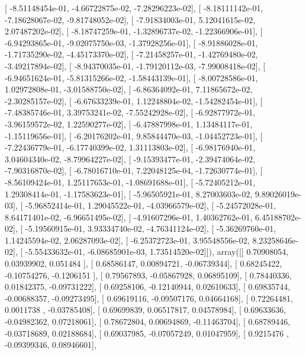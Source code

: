 \documentclass{article}
\begin{document}
       [ -8.51148454e-01,  -4.66722875e-02,  -7.28296223e-02],
       [ -8.18111142e-01,  -7.18628067e-02,  -9.81748052e-02],
       [ -7.91834003e-01,   5.12041615e-02,   2.07487202e-02],
       [ -8.18747259e-01,  -1.32896737e-02,  -1.22366906e-01],
       [ -6.94293865e-01,  -9.02075750e-03,  -1.37928256e-01],
       [ -8.91886028e-01,  -1.71735290e-02,  -4.45173370e-02],
       [ -7.21458257e-01,  -1.42769480e-02,  -3.49217894e-02],
       [ -8.94370035e-01,  -1.79120112e-03,  -7.99008418e-02],
       [ -6.94651624e-01,  -5.81315266e-02,  -1.58443139e-01],
       [ -8.00728586e-01,   1.02972808e-01,  -3.01588750e-02],
       [ -6.86364092e-01,   7.11865672e-02,  -2.30285157e-02],
       [ -6.67633239e-01,   1.12248804e-02,  -1.54282454e-01],
       [ -7.48385746e-01,   3.39753241e-02,  -7.55242928e-02],
       [ -6.92877972e-01,  -3.96159572e-02,   1.22590277e-02],
       [ -6.47887998e-01,   1.13484117e-01,  -1.15119656e-01],
       [ -6.20176202e-01,   9.85844470e-03,  -1.04452723e-01],
       [ -7.22436779e-01,  -6.17740399e-02,   1.31113803e-02],
       [ -6.98176940e-01,   3.04604340e-02,  -8.79964227e-02],
       [ -9.15393477e-01,  -2.39474064e-02,  -7.90316870e-02],
       [ -6.78016710e-01,   7.22048125e-04,  -1.72630774e-01],
       [ -8.56109424e-01,   1.25117653e-01,  -1.08691688e-01],
       [ -5.72405212e-01,   1.29308414e-01,  -1.17583623e-01],
       [ -5.96505921e-01,   8.27003603e-02,   9.89026019e-03],
       [ -5.96852414e-01,   1.29045522e-01,  -4.03966579e-02],
       [ -5.24572028e-01,   8.64171401e-02,  -6.96651495e-02],
       [ -4.91607296e-01,   1.40362762e-01,   6.45188702e-02],
       [ -5.19560915e-01,   3.93334740e-02,  -4.76341124e-02],
       [ -5.36269760e-01,   1.14245594e-02,   2.06287093e-02],
       [ -6.25372723e-01,   3.95548556e-02,   8.23258646e-02],
       [ -5.55433632e-01,  -6.08685901e-03,   1.73514520e-02]]), array([[ 0.70908054,  0.03939902,  0.051484  ],
       [ 0.68586147,  0.00894721, -0.06739344],
       [ 0.68245422, -0.10754276, -0.1206151 ],
       [ 0.79567893, -0.05867928,  0.06895109],
       [ 0.78440336,  0.01842375, -0.09731222],
       [ 0.69258106, -0.12140944,  0.02610633],
       [ 0.69835744, -0.00688357, -0.09273495],
       [ 0.69619116, -0.09507176,  0.04664168],
       [ 0.72264481,  0.0011738 , -0.03785408],
       [ 0.69699839,  0.06517817,  0.04578984],
       [ 0.69633636, -0.04982362,  0.07218061],
       [ 0.78672804,  0.00694869, -0.11463704],
       [ 0.68789446, -0.03718689,  0.02188684],
       [ 0.69037985, -0.07057249,  0.01047959],
       [ 0.9215476 , -0.09399346,  0.08946601],
\end{document}
